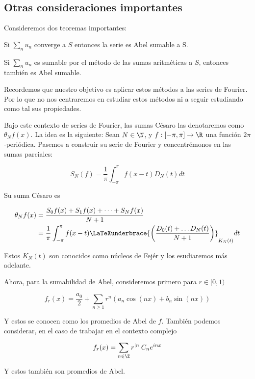 \subsection{Otras consideraciones importantes}

Consideremos dos teoremas importantes:

\begin{teo}[Abel]
    Si $\sum_n u_n$ converge a $S$ entonces la serie es Abel sumable a S.
\end{teo}

\begin{teo}
    Si $\sum_n u_n$ es sumable por el método de las sumas aritméticas a $S$, entonces también es Abel sumable.
\end{teo}

Recordemos que nuestro objetivo es aplicar estos métodos a las series de Fourier. Por lo que no nos centraremos en estudiar estos métodos ni a seguir estudiando como tal sus propiedades.

\begin{aco}
    Bajo este contexto de series de Fourier, las sumas Césaro las denotaremos como $\theta_N f(x)$. La idea es la siguiente: Sean $N \in \N$, y $f: [-\pi, \pi] \rightarrow \R$ una función $2\pi$-periódica. Pasemos a construir su serie de Fourier y concentrémonos en las sumas parciales:

    \[
        S_N(f) = \frac{1}{\pi} \int_{-\pi}^{\pi} f(x-t) D_N(t)dt
    \]

    Su suma Césaro es

    \begin{equation*}
        \begin{aligned}
            \theta_Nf(x) &= \frac{S_0f(x) + S_1f(x) + \dots + S_Nf(x)}{N+1} \\
                &= \frac{1}{\pi} \int_{-\pi}^{\pi} f(x-t) \LaTeXunderbrace{\left( \frac{D_0(t) + \dots D_N(t)}{N+1} \right)}_{K_N(t)}dt
        \end{aligned}
    \end{equation*}

    Estos $K_N(t)$ son conocidos como núcleos de Fejér y los esudiaremos más adelante.
\end{aco}

\begin{aco}
    Ahora, para la sumabilidad de Abel, consideremos primero para $r \in [0,1)$

    \[
        f_r(x) = \frac{a_0}{2} + \sum_{n \geq 1} r^n (a_n \cos(nx) + b_n \sin(nx))
    \]

    Y estos se conocen como los promedios de Abel de $f$. También podemos considerar, en el caso de trabajar en el contexto complejo

    \[
        f_r(x) = \sum_{n \in \Z} r^{|n|} C_n e^{inx}
    \]

    Y estos también son promedios de Abel.
\end{aco}